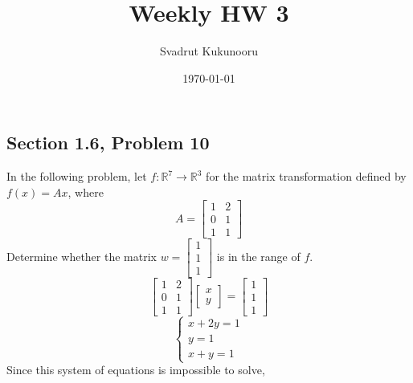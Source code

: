 \documentclass[letterpaper]{report}
\title{Weekly HW 3}
\author{Svadrut Kukunooru}
\date{\today}
\begin{document}
\begin{titlepage}
    \maketitle
\end{titlepage}

\subsection{Section 1.6, Problem 10}%
\label{sub:Section 1.6, Problem 10}
In the following problem, let $f : \mathbb{R}^7 \to \mathbb{R}^3$ for the matrix transformation defined by $f(x) = Ax$, where 
\[
A = 
\begin{bmatrix} 
    1 & 2 \\
    0 & 1 \\
    1 & 1
\end{bmatrix} 
\] 
Determine whether the matrix $w = \begin{bmatrix} 
1 \\ 1 \\ 1
\end{bmatrix}$ is in the range of $f$.
\[
\begin{bmatrix} 
    1 & 2 \\
    0 & 1 \\
    1 & 1
\end{bmatrix} 
\begin{bmatrix} 
x \\ y
\end{bmatrix} = 
\begin{bmatrix} 
1 \\ 1 \\ 1
\end{bmatrix} 
\] 
\begin{equation}
    \begin{cases}
        x + 2y = 1 \\
        y = 1 \\
        x + y = 1
    \end{cases}
\end{equation}
Since this system of equations is impossible to solve, 
\end{document}
